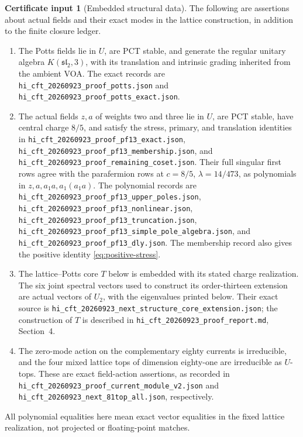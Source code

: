 \documentclass[11pt,a4paper]{article}
\theoremstyle{definition}
\newtheorem{certificate}[theorem]{Certificate input}
\newcommand{\artifact}[1]{\textnormal{\nolinkurl{#1}}}
\begin{document}
\begin{certificate}[Embedded structural data]
\label{cert:structural-inputs}
The following are assertions about actual fields and their exact modes
in the lattice construction, in addition to the finite closure ledger.
\begin{enumerate}
\item The Potts fields lie in $U$, are PCT stable, and generate the
regular unitary algebra $K(\mathfrak{sl}_2,3)$, with its translation
and intrinsic grading inherited from the ambient VOA. The exact
records are \artifact{hi_cft_20260923_proof_potts.json} and
\artifact{hi_cft_20260923_proof_potts_exact.json}.
\item The actual fields $z,a$ of weights two and three lie in $U$,
are PCT stable, have central charge $8/5$, and satisfy the stress,
primary, and translation identities in
\artifact{hi_cft_20260923_proof_pf13_exact.json},
\artifact{hi_cft_20260923_proof_pf13_membership.json}, and
\artifact{hi_cft_20260923_proof_remaining_coset.json}.
Their full singular first rows agree with the parafermion rows at
$c=8/5$, $\lambda=14/473$, as polynomials in $z,a,a_1a,a_1(a_1a)$.
The polynomial records are
\artifact{hi_cft_20260923_proof_pf13_upper_poles.json},
\artifact{hi_cft_20260923_proof_pf13_nonlinear.json},
\artifact{hi_cft_20260923_proof_pf13_truncation.json},
\artifact{hi_cft_20260923_proof_pf13_simple_pole_algebra.json}, and
\artifact{hi_cft_20260923_proof_pf13_dly.json}.
The membership record also gives the positive identity
\eqref{eq:positive-stress}.
\item The lattice--Potts core $T$ below is embedded with its stated
charge realization. The six joint spectral vectors used to construct
its order-thirteen extension are actual vectors of $U_2$, with the
eigenvalues printed below. Their exact source is
\artifact{hi_cft_20260923_next_structure_core_extension.json}; the
construction of $T$ is described in
\artifact{hi_cft_20260923_proof_report.md}, Section~4.
\item The zero-mode action on the complementary eighty currents is
irreducible, and the four mixed lattice tops of dimension eighty-one
are irreducible as $U$-tops. These are exact
field-action assertions, as recorded in
\artifact{hi_cft_20260923_proof_current_module_v2.json} and
\artifact{hi_cft_20260923_next_81top_all.json}, respectively.
\end{enumerate}
All polynomial equalities here mean exact vector equalities in the
fixed lattice realization, not projected or floating-point matches.
\end{certificate}
\end{document}
